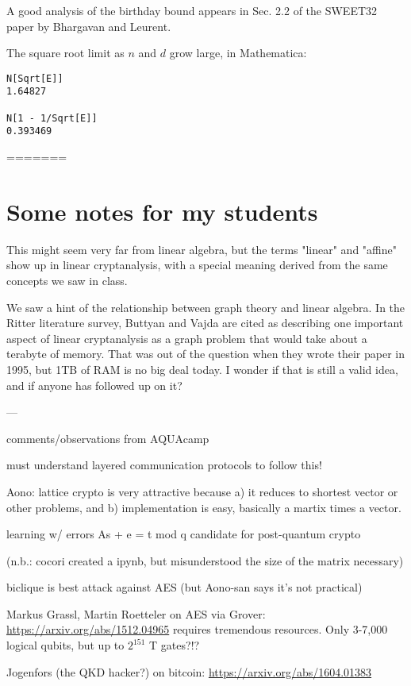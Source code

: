 \documentclass[%
 aip,
 jmp,%
 amsmath,amssymb,
 reprint,%
]{revtex4-1}
\begin{document}
A good analysis of the birthday bound appears in Sec. 2.2 of the
SWEET32 paper by Bhargavan and Leurent.

The square root limit as $n$ and $d$ grow large, in Mathematica:

\begin{verbatim}
N[Sqrt[E]]
1.64827

N[1 - 1/Sqrt[E]]
0.393469
\end{verbatim}

=======

\section{Some notes for my students}

This might seem very far from linear algebra, but the terms "linear"
and "affine" show up in linear cryptanalysis, with a special meaning
derived from the same concepts we saw in class.

We saw a hint of the relationship between graph theory and linear
algebra.  In the Ritter literature survey, Buttyan and Vajda are cited
as describing one important aspect of linear cryptanalysis as a graph
problem that would take about a terabyte of memory.  That was out of
the question when they wrote their paper in 1995, but 1TB of RAM is no
big deal today.  I wonder if that is still a valid idea, and if anyone
has followed up on it?

---

comments/observations from AQUAcamp

must understand layered communication protocols to follow this!

Aono: lattice crypto is very attractive because a) it reduces to
shortest vector or other problems, and b) implementation is easy,
basically a martix times a vector.

learning w/ errors As + e = t mod q
candidate for post-quantum crypto

(n.b.: cocori created a ipynb, but misunderstood the size of the
matrix necessary)

biclique is best attack against AES
(but Aono-san says it's not practical)

Markus Grassl, Martin Roetteler on AES via Grover:
\url{https://arxiv.org/abs/1512.04965}
requires tremendous resources.
Only 3-7,000 logical qubits, but up to $2^{151}$ T gates?!?

Jogenfors (the QKD hacker?) on bitcoin:
\url{https://arxiv.org/abs/1604.01383}
\end{document}
